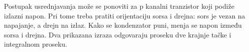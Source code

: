 Postupak usrednjavanja može se ponoviti za p kanalni tranzistor koji podiže izlazni napon. Pri tome treba pratiti orijentaciju sorsa i drejna: sors je vezan na napajanje, a drejn na izlaz. Kako se kondenzator puni, menja se napon između sorsa i drejna. Dva prikazana izraza odgovaraju proseku dve krajnje tačke i integralnom proseku.
